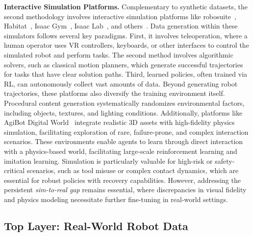 \documentclass[10pt, a4paper, logo, copyright]{googledeepmind} %
\begin{document}
\textbf{Interactive Simulation Platforms.} Complementary to synthetic datasets, the second methodology involves interactive simulation platforms like robosuite~\cite{zhu2020robosuite}, Habitat~\cite{savva2019habitat}, Isaac Gym~\cite{S2021_28dd2c79}, Isaac Lab~\cite{mittal2023orbit}, and others~\cite{ehsani2023spoc, yenamandra2023homerobot, mees2022calvin, RLBench, Puig_2018_CVPR, li2024evaluating, LIBERO, cheng2024navila, FMB, walke2024bridgedatav2datasetrobot, yu2020meta, iTHOR, pmlr-v100-gupta20a, srivastava2022behavior, Puig_2018_CVPR, Shah2017AirSimHV, zeng2021transporter, jiang2022vima, ebert2021bridgedataboostinggeneralization, li2024simpler, beattie2016deepmindlab, bellemare2013arcade, lee2021beyond, ramrakhya2022habitat, lin2023mcu, nasiriany2024robocasa, lynch2023interactive}. Data generation within these simulators follows several key paradigms. First, it involves teleoperation, where a human operator uses VR controllers, keyboards, or other interfaces to control the simulated robot and perform tasks. The second method involves algorithmic solvers, such as classical motion planners, which generate successful trajectories for tasks that have clear solution paths. Third, learned policies, often trained via RL, can autonomously collect vast amounts of data. Beyond generating robot trajectories, these platforms also diversify the training environment itself. Procedural content generation systematically randomizes environmental factors, including objects, textures, and lighting conditions. Additionally, platforms like AgiBot Digital World~\cite{contributors2025agibotdigitalworld} integrate realistic 3D assets with high-fidelity physics simulation, facilitating exploration of rare, failure-prone, and complex interaction scenarios. These environments enable agents to learn through direct interaction with a physics-based world, facilitating large-scale reinforcement learning and imitation learning. Simulation is particularly valuable for high-risk or safety-critical scenarios, such as tool misuse or complex contact dynamics, which are essential for robust policies with recovery capabilities. However, addressing the persistent \textit{sim-to-real gap} remains essential, where discrepancies in visual fidelity and physics modeling necessitate further fine-tuning in real-world settings.

\subsection{Top Layer: Real-World Robot Data}
\end{document}
